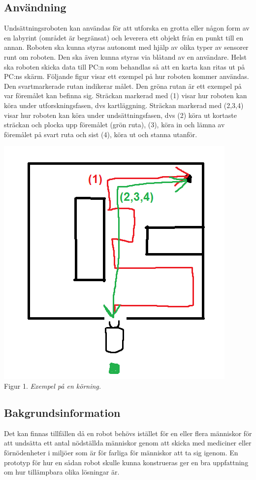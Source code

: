 \documentclass[11pt]{article}
\begin{document}
\begin{flushleft}
\subsection{Användning}
Undsättningsroboten kan användas för att utforska en grotta eller någon form av en labyrint (området är begränsat) och leverera ett objekt från en punkt till en annan. 
Roboten ska kunna styras autonomt med hjälp av olika typer av sensorer runt om roboten. Den ska även kunna styras via blåtand av en användare. 
Helst ska roboten skicka data till PC:n som behandlas så att en karta kan ritas ut på PC:ns skärm.
Följande figur visar ett exempel på hur roboten kommer användas. Den svartmarkerade rutan indikerar målet. Den gröna rutan är ett exempel på var föremålet kan befinna sig. Sträckan markerad med (1) visar hur roboten kan köra under utforskningsfasen, dvs kartläggning. Sträckan markerad med (2,3,4) visar hur roboten kan köra under undsättningsfasen, dvs (2) köra ut kortaste sträckan och plocka upp föremålet (grön ruta), (3), köra in och lämna av föremålet på svart ruta och sist (4), köra ut och stanna utanför.
\begin{center}
\includegraphics[scale=0.7]{anvandnings_exempel}\\
Figur 1. \textit{Exempel på en körning.}
\end{center}
\pagebreak
\subsection{Bakgrundsinformation}
Det kan finnas tillfällen då en robot behövs istället för en eller flera människor för att undsätta ett antal nödställda människor genom att skicka med mediciner eller förnödenheter i miljöer som är för farliga för människor att ta sig igenom. En prototyp för hur en sådan robot skulle kunna konstrueras ger en bra uppfattning om hur tillämpbara olika lösningar är.


\end{flushleft}
\end{document}
